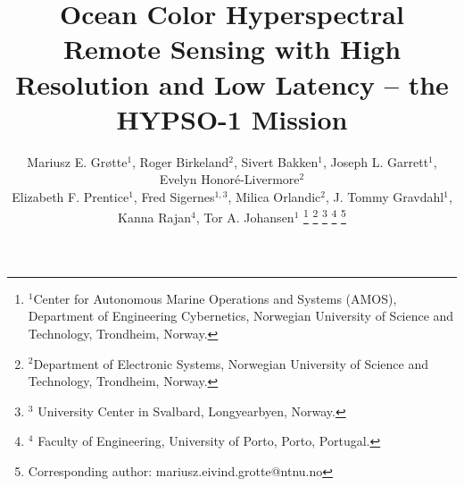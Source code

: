 \documentclass[letterpaper, 10 pt, conference]{ieeeconf}
\begin{document}
\title{Ocean Color Hyperspectral Remote Sensing with High Resolution and Low Latency – the HYPSO-1 Mission}

\author{Mariusz E. Gr{\o}tte$^1$, Roger Birkeland$^2$, Sivert Bakken$^1$, Joseph L. Garrett$^1$, Evelyn Honor{\'e}-Livermore$^2$ \\ 
Elizabeth F. Prentice$^1$, Fred Sigernes$^{1,3}$, Milica Orlandic$^{2}$, J. Tommy Gravdahl$^{1}$, Kanna Rajan$^{4}$, Tor A. Johansen$^1$
  \thanks{ $^1$Center for Autonomous Marine Operations and Systems
    (AMOS), Department of Engineering Cybernetics, Norwegian
    University of Science and Technology, Trondheim, Norway.}
  \thanks{
    $^2$Department of Electronic Systems, Norwegian University of Science and Technology, Trondheim, Norway.}
  \thanks{
    $^3$ University Center in Svalbard, Longyearbyen, Norway.}
		\thanks{
    $^4$ Faculty of Engineering, University of Porto, Porto, Portugal.}
  \thanks{Corresponding author: {mariusz.eivind.grotte@ntnu.no}}
}

\end{document}
